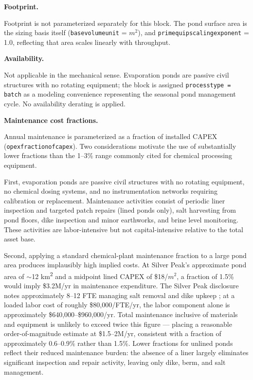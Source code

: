 \documentclass{article}
\renewcommand\_{\textunderscore\allowbreak}
\begin{document}
\medskip
\noindent\textbf{Footprint.}\quad

Footprint is not parameterized separately for this block. The pond surface area is the sizing basis itself (\texttt{base\_volume\_unit} = $\si{m^2}$), and \texttt{prim\_equip\_scaling\_exponent} = 1.0, reflecting that area scales linearly with throughput.

\medskip
\noindent\textbf{Availability.}\quad

Not applicable in the mechanical sense. Evaporation ponds are passive civil structures with no rotating equipment; the block is assigned \texttt{process\_type = batch} as a modeling convenience representing the seasonal pond management cycle. No availability derating is applied.

\medskip
\noindent\textbf{Maintenance cost fractions.}\quad

Annual maintenance is parameterized as a fraction of installed CAPEX (\texttt{opex\_fraction\_of\_capex}). Two considerations motivate the use of substantially lower fractions than the 1--3\% range commonly cited for chemical processing equipment.
 
First, evaporation ponds are passive civil structures with no rotating equipment, no chemical dosing systems, and no instrumentation networks requiring calibration or replacement. Maintenance activities consist of periodic liner inspection and targeted patch repairs (lined ponds only), salt harvesting from pond floors, dike inspection and minor earthworks, and brine level monitoring. These activities are labor-intensive but not capital-intensive relative to the total asset base.
 
Second, applying a standard chemical-plant maintenance fraction to a large pond area produces implausibly high implied costs. At Silver Peak's approximate pond area of $\sim$12 \si{km^2} and a midpoint lined CAPEX of \$18/$\si{m^2}$, a fraction of 1.5\% would imply \$3.2M/yr in maintenance expenditure. The Silver Peak disclosure notes approximately 8--12 FTE managing salt removal and dike upkeep \cite{srkconsultingSECTechnicalReport2023a}; at a loaded labor cost of roughly \$80,000/FTE/yr, the labor component alone is approximately \$640,000--\$960,000/yr. Total maintenance inclusive of materials and equipment is unlikely to exceed twice this figure --- placing a reasonable order-of-magnitude estimate at \$1.5--2M/yr, consistent with a fraction of approximately 0.6--0.9\% rather than 1.5\%. Lower fractions for unlined ponds reflect their reduced maintenance burden: the absence of a liner largely eliminates significant inspection and repair activity, leaving only dike, berm, and salt management.
 
\end{document}
